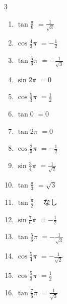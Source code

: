 \begin{multicols}{3}
\begin{enumerate}
  \item $\displaystyle \tan{\frac{\pi}{6}}$
        $\displaystyle =\frac{1}{\sqrt{3}}$

  \item $\displaystyle \cos{\frac{4}{3}\pi}$
        $\displaystyle =-\frac{1}{2}$

  \item $\displaystyle \tan{\frac{5}{6}\pi}$
        $\displaystyle =-\frac{1}{\sqrt{3}}$

  \item $\displaystyle \sin{2\pi}$
        $\displaystyle =0$

\columnbreak %

\resetques

  \item $\displaystyle \cos{\frac{5}{3}\pi}$
        $\displaystyle =\frac{1}{2}$

  \item $\displaystyle \tan{0}$
        $\displaystyle =0$

  \item $\displaystyle \tan{2\pi}$
        $\displaystyle =0$

  \item $\displaystyle \cos{\frac{2}{3}\pi}$
        $\displaystyle =-\frac{1}{2}$

  \item $\displaystyle \sin{\frac{3}{4}\pi}$
        $\displaystyle =\frac{1}{\sqrt{2}}$

  \item $\displaystyle \tan{\frac{\pi}{3}}$
        $\displaystyle =\sqrt{3}$

  \item $\displaystyle \tan{\frac{\pi}{2}}$
        $\displaystyle \quad なし$

  \item $\displaystyle \sin{\frac{7}{6}\pi}$
        $\displaystyle =-\frac{1}{2}$

  \item $\displaystyle \tan{\frac{5}{6}\pi}$
        $\displaystyle =-\frac{1}{\sqrt{3}}$

  \item $\displaystyle \cos{\frac{5}{4}\pi}$
        $\displaystyle =-\frac{1}{\sqrt{2}}$

  \item $\displaystyle \cos{\frac{5}{3}\pi}$
        $\displaystyle =\frac{1}{2}$

  \item $\displaystyle \tan{\frac{7}{6}\pi}$
        $\displaystyle =\frac{1}{\sqrt{3}}$


\end{enumerate}
\end{multicols}
